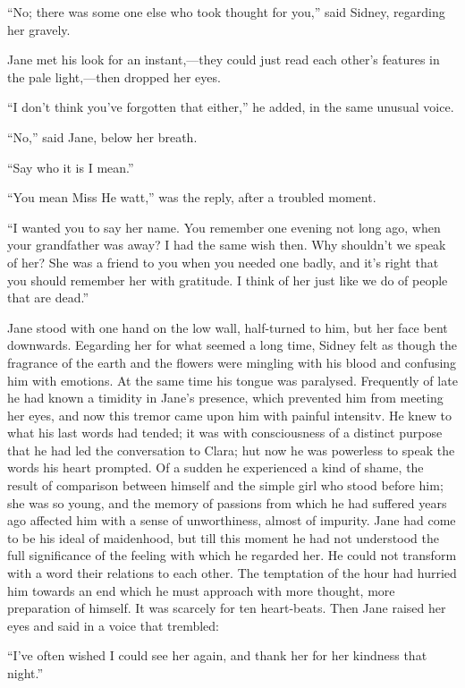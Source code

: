 ``No; there was some one else who took thought for you,'' said Sidney,
regarding her gravely.

Jane met his look for an instant,---they could just read each other's
features in the pale light,---then dropped her eyes.

``I don't think you've forgotten that either,'' he added, in the same
unusual voice.

{}``No,'' said Jane, below her breath.

``Say who it is I mean.''

``You mean Miss He watt,'' was the reply, after a troubled moment.

``I wanted you to say her name. You remember one evening not long ago,
when your grandfather was away? I had the same wish then. Why shouldn't
we speak of her? She was a friend to you when you needed one badly, and
it's right that you should remember her with gratitude. I think of her
just like we do of people that are dead.''

Jane stood with one hand on the low wall, half-turned to him, but her
face bent downwards. Eegarding her for what seemed a long time, Sidney
felt as though the fragrance of the earth and the flowers were mingling
with his blood and confusing him with emotions. At the same time his
tongue was paralysed. Frequently of late he had known a timidity in
Jane's presence, which prevented him from meeting her eyes, and now this
tremor came upon him with painful intensitv. He knew to what his last
{}words had tended; it was with consciousness of a distinct purpose that
he had led the conversation to Clara; hut now he was powerless to speak
the words his heart prompted. Of a sudden he experienced a kind of
shame, the result of comparison between himself and the simple girl who
stood before him; she was so young, and the memory of passions from
which he had suffered years ago affected him with a sense of
unworthiness, almost of impurity. Jane had come to be his ideal of
maidenhood, but till this moment he had not understood the full
significance of the feeling with which he regarded her. He could not
transform with a word their relations to each other. The temptation of
the hour had hurried him towards an end which he must approach with more
thought, more preparation of himself. It was scarcely for ten
heart-beats. Then Jane raised her eyes and said in a voice that
trembled:

``I've often wished I could see her again, and thank her for her
kindness that night.''

